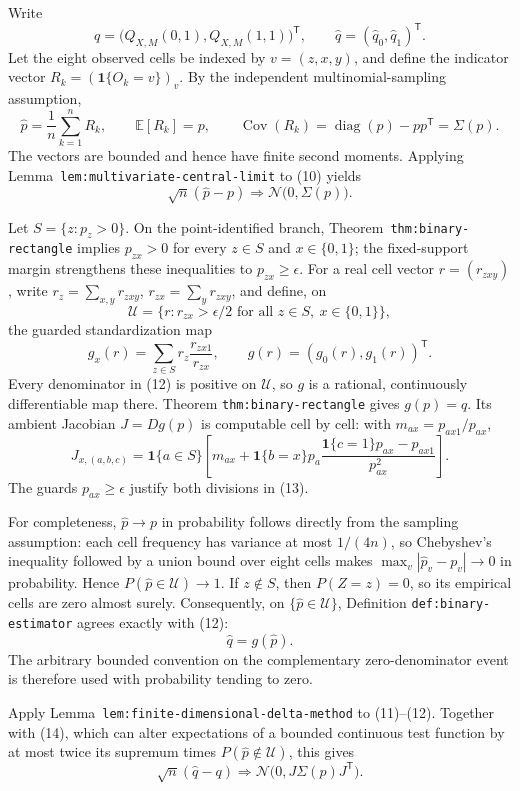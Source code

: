 Write
\[
q=\bigl(Q_{X,M}(0,1),Q_{X,M}(1,1)\bigr)^{\mathsf T},
\qquad
\widehat q=(\widehat q_0,\widehat q_1)^{\mathsf T}.
\]
Let the eight observed cells be indexed by \(v=(z,x,y)\), and define the
indicator vector \(R_k=(\mathbf 1\{O_k=v\})_v\).  By the independent
multinomial-sampling assumption,
\[
\widehat p=\frac1n\sum_{k=1}^nR_k,
\qquad
\mathbb E[R_k]=p,
\qquad
\operatorname{Cov}(R_k)=\operatorname{diag}(p)-pp^{\mathsf T}=\Sigma(p).
\tag{10}
\]
The vectors are bounded and hence have finite second moments.  Applying
Lemma~\texttt{lem:multivariate-central-limit} to (10) yields
\[
\sqrt n(\widehat p-p)\Rightarrow
\mathcal N\bigl(0,\Sigma(p)\bigr).
\tag{11}
\]

Let \(S=\{z:p_z>0\}\).  On the point-identified branch,
Theorem~\texttt{thm:binary-rectangle} implies
\(p_{zx}>0\) for every \(z\in S\) and \(x\in\{0,1\}\); the fixed-support
margin strengthens these inequalities to \(p_{zx}\ge\epsilon\).  For a
real cell vector \(r=(r_{zxy})\), write
\(r_z=\sum_{x,y}r_{zxy}\), \(r_{zx}=\sum_yr_{zxy}\), and define, on
\[
\mathcal U=\{r:r_{zx}>\epsilon/2
\text{ for all }z\in S,\ x\in\{0,1\}\},
\]
the guarded standardization map
\[
g_x(r)=\sum_{z\in S}r_z\frac{r_{zx1}}{r_{zx}},
\qquad
g(r)=(g_0(r),g_1(r))^{\mathsf T}.
\tag{12}
\]
Every denominator in (12) is positive on \(\mathcal U\), so \(g\) is a
rational, continuously differentiable map there.  Theorem
\texttt{thm:binary-rectangle} gives \(g(p)=q\).  Its ambient Jacobian
\(J=Dg(p)\) is computable cell by cell: with
\(m_{ax}=p_{ax1}/p_{ax}\),
\[
J_{x,(a,b,c)}
=\mathbf 1\{a\in S\}
\left[
m_{ax}
+\mathbf 1\{b=x\}p_a
\frac{\mathbf 1\{c=1\}p_{ax}-p_{ax1}}{p_{ax}^2}
\right].
\tag{13}
\]
The guards \(p_{ax}\ge\epsilon\) justify both divisions in (13).

For completeness, \(\widehat p\to p\) in probability follows directly from
the sampling assumption: each cell frequency has variance at most \(1/(4n)\),
so Chebyshev's inequality followed by a union bound over eight cells makes
\(\max_v|\widehat p_v-p_v|\to0\) in probability.  Hence
\(P(\widehat p\in\mathcal U)\to1\).  If \(z\notin S\), then \(P(Z=z)=0\),
so its empirical cells are zero almost surely.  Consequently, on
\(\{\widehat p\in\mathcal U\}\), Definition
\texttt{def:binary-estimator} agrees exactly with (12):
\[
\widehat q=g(\widehat p).
\tag{14}
\]
The arbitrary bounded convention on the complementary zero-denominator
event is therefore used with probability tending to zero.

Apply Lemma~\texttt{lem:finite-dimensional-delta-method} to (11)--(12).
Together with (14), which can alter expectations of a bounded continuous
test function by at most twice its supremum times
\(P(\widehat p\notin\mathcal U)\), this gives
\[
\sqrt n(\widehat q-q)
\Rightarrow
\mathcal N\bigl(0,J\Sigma(p)J^{\mathsf T}\bigr).
\tag{15}
\]

